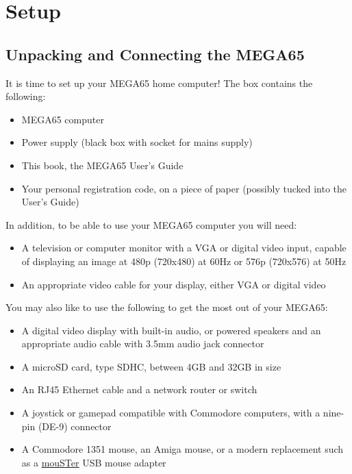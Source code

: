 \chapter{Setup}

\section{Unpacking and Connecting the MEGA65}
\label{cha:setup}

It is time to set up your MEGA65 home computer! The box contains the following:

\begin{itemize}
\setlength\itemsep{-0.75mm}
\item MEGA65 computer
\item Power supply (black box with socket for mains supply)
\item This book, the MEGA65 User's Guide
\item Your personal registration code, on a piece of paper (possibly tucked into the User's Guide)
\end{itemize}

In addition, to be able to use your MEGA65 computer you will need:

\begin{itemize}
\item A television or computer monitor with a VGA or digital video input, capable of displaying an image at 480p (720x480) at 60Hz or 576p (720x576) at 50Hz
\item An appropriate video cable for your display, either VGA or digital video
\end{itemize}

You may also like to use the following to get the most out of your MEGA65:

\begin{itemize}
\item A digital video display with built-in audio, or powered speakers and an appropriate audio cable with 3.5mm audio jack connector
\item A microSD card, type SDHC, between 4GB and 32GB in size
\item An RJ45 Ethernet cable and a network router or switch
\item A joystick or gamepad compatible with Commodore computers, with a nine-pin (DE-9) connector
\item A Commodore 1351 mouse, an Amiga mouse, or a modern replacement such as a \href{https://retrohax.net/shop/amiga/mouster/}{mouSTer} USB mouse adapter
\end{itemize}

